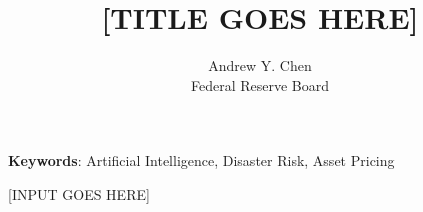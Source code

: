 \documentclass[12pt]{article}
\begin{document}
\title{[TITLE GOES HERE]}
\author{{Andrew Y. Chen}\\
{\normalsize Federal Reserve Board}}
\date{}

\maketitle

\begin{abstract}
\begin{singlespace}
\end{singlespace}
\end{abstract}
\vspace{10ex}

\noindent\textbf{Keywords}: Artificial Intelligence, Disaster Risk, Asset Pricing
\thispagestyle{empty}
\newpage


[INPUT GOES HERE]

\printbibliography

\newpage
\begin{appendix}
       
     
\end{appendix}
\end{document}
